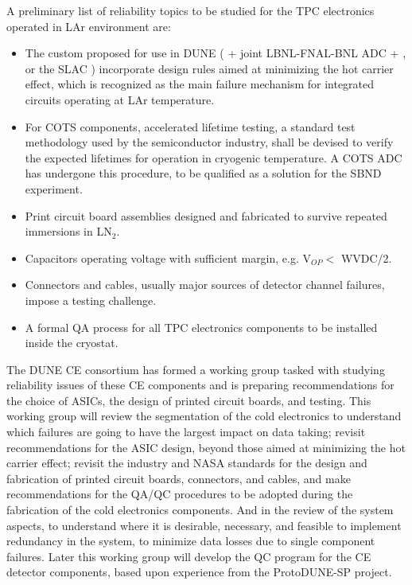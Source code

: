 A preliminary list of reliability topics to be studied for the TPC electronics operated in LAr environment are:
\begin{itemize}
	\item The custom  proposed for use in DUNE ( + joint LBNL-FNAL-BNL ADC +  , or the SLAC  ) incorporate design rules aimed at minimizing the hot carrier effect\cite{Li:2013ieee}\cite{Hoff:2015hax}, which is recognized as the main failure mechanism for integrated circuits operating at LAr temperature.
	\item For COTS components, accelerated lifetime testing, a standard test methodology used by the semiconductor industry, shall be devised to verify the expected lifetimes for operation in cryogenic temperature. A COTS ADC has undergone this procedure, to be qualified as a solution for the SBND experiment\cite{Chen:2018zic}.
	\item Print circuit board assemblies designed and fabricated to survive repeated immersions in LN$_2$.
	\item Capacitors operating voltage with sufficient margin, e.g. V$_{OP}<$ WVDC/2.
	\item Connectors and cables, usually major sources of detector channel failures, impose a testing challenge.
	\item A formal QA process for all TPC electronics components to be installed inside the cryostat.
\end{itemize}
The DUNE CE consortium has formed a working group tasked with studying reliability issues of these CE components and is preparing recommendations for the choice of ASICs, the design of printed circuit boards, and testing. This working group will review the segmentation of the cold electronics to understand which failures are going to have the largest impact on data taking; revisit recommendations for the ASIC design, beyond those aimed at minimizing the hot carrier effect; revisit the industry and NASA standards for the design and fabrication of printed circuit boards, connectors, and cables, and make recommendations for the QA/QC procedures to be adopted during the fabrication of the cold electronics components. And in the review of the system aspects, to understand where it is desirable, necessary, and feasible to implement redundancy in the system, to minimize data losses due to single component failures. Later this working group will develop the QC program for the CE detector components, based upon experience from the ProtoDUNE-SP project.
